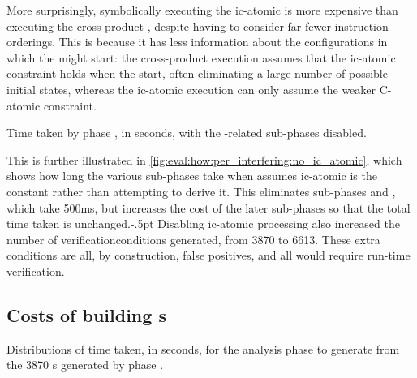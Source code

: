 More surprisingly, symbolically executing the \gls{ic-atomic}
{\StateMachine} is more expensive than executing the cross-product
{\StateMachine}, despite having to consider far fewer instruction
orderings.  This is because it has less information about the
configurations in which the {\StateMachines} might start: the
cross-product execution assumes that the \gls{ic-atomic} constraint
holds when the {\StateMachines} start, often eliminating a large
number of possible initial states, whereas the \gls{ic-atomic}
execution can only assume the weaker C-atomic constraint.

\begin{sanefig}
  \caption{Time taken by phase \subinterfering{}, in seconds, with the
    -related sub-phases disabled.}
  \label{fig:eval:how:per_interfering:no_ic_atomic}
\end{sanefig}

This is further illustrated in
\autoref{fig:eval:how:per_interfering:no_ic_atomic}, which shows how
long the various sub-phases take when {\technique} assumes
\gls{ic-atomic} is the constant {\true} rather than attempting to
derive it.  This eliminates sub-phases  and
, which take 500ms, but increases the cost of the
later sub-phases so that the total time taken is
unchanged.\kern-.5pt
Disabling \gls{ic-atomic} processing also increased the number of
\glspl{verificationcondition} generated, from 3870 to 6613.  These
extra conditions are all, by construction, false positives, and all
would require run-time verification.

\subsection{Costs of building s}

\begin{sanefig}
  \caption{Distributions of time taken, in seconds, for the \subenf{}
    analysis phase to generate  from the
    3870 s generated by phase
    \subinterfering{}.}
  \label{fig:eval:how:build_enforcer}
\end{sanefig}

